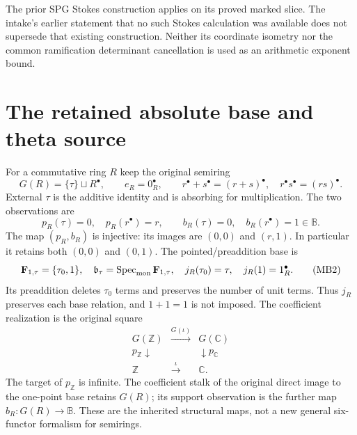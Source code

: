 \documentclass[11pt,a4paper]{article}
\theoremstyle{definition}
\begin{document}
The prior SPG Stokes construction applies on its proved marked slice.
The intake's earlier statement that no such Stokes calculation was
available does not supersede that existing construction. Neither its
coordinate isometry nor the common ramification determinant cancellation
is used as an arithmetic exponent bound.


\section{The retained absolute base and theta source}
For a commutative ring $R$ keep the original semiring
\begin{equation}
 G(R)=\{\tau\}\sqcup R^\bullet,\qquad e_R=0_R^\bullet,\qquad
 r^\bullet+s^\bullet=(r+s)^\bullet,\quad
 r^\bullet s^\bullet=(rs)^\bullet.                    \tag{MB1}
\end{equation}
External $\tau$ is the additive identity and is absorbing for multiplication.
The two observations are
\[
 p_R(\tau)=0,\quad p_R(r^\bullet)=r,\qquad
 b_R(\tau)=0,\quad b_R(r^\bullet)=1\in\mathbb B.
\]
The map $(p_R,b_R)$ is injective: its images are $(0,0)$ and $(r,1)$.
In particular it retains both $(0,0)$ and $(0,1)$.
The pointed/preaddition base is
\begin{equation}
 \mathbf F_{1,\tau}=\{\tau_0,1\},\quad
 \mathfrak b_\tau=\operatorname{Spec}_{\rm mon}\mathbf F_{1,\tau},
 \quad j_R(\tau_0)=\tau,\quad j_R(1)=1_R^\bullet .       \tag{MB2}
\end{equation}
Its preaddition deletes $\tau_0$ terms and preserves the number of unit
terms.  Thus $j_R$ preserves each base relation, and $1+1=1$ is not imposed.
The coefficient realization is the original square
\begin{equation}
\begin{array}{ccc}
G(\mathbb Z)&\xrightarrow{G(\iota)}&G(\mathbb C)\\
p_{\mathbb Z}\downarrow&&\downarrow p_{\mathbb C}\\
\mathbb Z&\xrightarrow{\iota}&\mathbb C.
\end{array}                                                    \tag{MB3}
\end{equation}
The target of $p_{\mathbb Z}$ is infinite.  The coefficient stalk of the
original direct image to the one-point base retains $G(R)$; its support
observation is the further map $b_R:G(R)\to\mathbb B$.
These are the inherited structural maps, not a new general six-functor
formalism for semirings.
\end{document}
